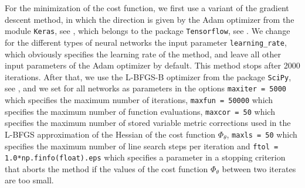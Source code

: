 For the minimization of the cost function, we first use a variant of the gradient descent method, in which the direction is given by the Adam optimizer from the module \lstinline!Keras!, see \cite{Chollet:2015}, which belongs to the package \lstinline!Tensorflow!, see \cite{TensorFlow}. We change for the different types of neural networks the input parameter \lstinline!learning_rate!, which obviously specifies the learning rate of the method, and leave all other input parameters of the Adam optimizer by default. This method stops after 2000 iterations. After that, we use the L-BFGS-B optimizer from the package \lstinline!SciPy!, see \cite{SciPy:2020}, and we set for all networks as parameters in the options \lstinline!maxiter = 5000! which specifies the maximum number of iterations, \lstinline!maxfun = 50000! which specifies the maximum number of function evaluations, \lstinline!maxcor = 50! which specifies the maximum number of stored variable metric corrections used in the L-BFGS approximation of the Hessian of the cost function $\Phi_{\theta}$, \lstinline!maxls = 50! which specifies the maximum number of line search steps per iteration and \lstinline!ftol = 1.0*np.finfo(float).eps! which specifies a parameter in a stopping criterion that aborts the method if the values of the cost function $\Phi_{\theta}$ between two iterates are too small.









